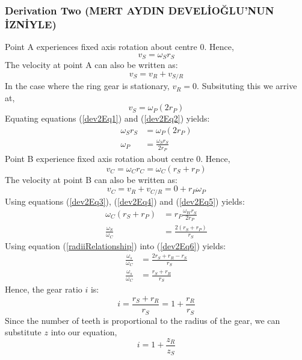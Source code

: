 \documentclass[12pt]{article}
\numberwithin{equation}{section}
\begin{document}
\begin{flushleft}
\subsubsection{Derivation Two (MERT AYDIN DEVELİOĞLU'NUN İZNİYLE)}
Point A experiences fixed axis rotation about centre $0$. Hence,
\begin{equation}
  v_S = \omega_S r_S
  \label{dev2Eq1}
\end{equation}
The velocity at point A can also be written as:
\begin{equation}
  v_S = v_R + v_{S/R}
\end{equation}
In the case where the ring gear is stationary, \(v_R = 0\). Subsituting this we arrive at,
\begin{equation}
  v_S = \omega_P(2r_P)
  \label{dev2Eq2}
\end{equation}
Equating equations (\ref{dev2Eq1}) and (\ref{dev2Eq2}) yields:
\begin{align}
  \omega_S r_S &= \omega_P (2r_P)\\
  \omega_P &= \frac{\omega_S r_S}{2r_P} \label{dev2Eq3}
\end{align}
Point B experience fixed axis rotation about centre $0$. Hence, 
\begin{equation}
  v_C = \omega_C r_C = \omega_C (r_S + r_P) \label{dev2Eq4}
\end{equation}
The velocity at point B can also be written as:
\begin{equation}
  v_C = v_R + v_{C/R} = 0 + r_P \omega_P \label{dev2Eq5}
\end{equation}
Using equations (\ref{dev2Eq3}), (\ref{dev2Eq4}) and (\ref{dev2Eq5}) yields:
\begin{align}
  \omega_C (r_S + r_P) &= r_P \frac{\omega_W r_S}{2r_P}\\
  \frac{\omega_S}{\omega_C} &= \frac{2(r_S + r_P)}{r_S} \label{dev2Eq6}
\end{align}
Using equation (\ref{radiiRelationship}) into (\ref{dev2Eq6}) yields:
\begin{align}
  \frac{\omega_s}{\omega_C} &= \frac{2r_S + r_R - r_S}{r_S}\\
  \frac{\omega_s}{\omega_C} &= \frac{r_S + r_R}{r_S}
\end{align}
Hence, the gear ratio $i$ is:
\begin{equation}
  i = \frac{r_S + r_R}{r_S} = 1 + \frac{r_R}{r_S}
\end{equation}
Since the number of teeth is proportional to the radius of the gear, we can substitute $z$ into our equation,
\begin{equation}
  i = 1 + \frac{z_R}{z_S}
\end{equation}

\end{flushleft}
\end{document}
